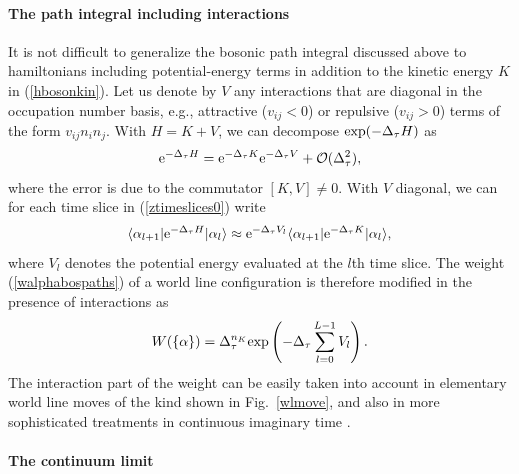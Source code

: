 \documentclass[draft,numberedheadings]{aipproc}
\begin{document}
\paragraph{The path integral including interactions}

It is not difficult to generalize the bosonic path integral discussed above to hamiltonians including potential-energy terms in addition to
the kinetic energy $K$ in (\ref{hbosonkin}). Let us denote by $V$ any interactions that are diagonal in the occupation number basis, e.g.,
attractive ($v_{ij}<0$) or repulsive ($v_{ij}>0$) terms of the form $v_{ij}n_in_j$. With $H=K+V$, we can decompose ${\rm exp}{(-\Delta_\tau H)}$ as
\begin{equation}
{\rm e}^{-\Delta_\tau H} = {\rm e}^{-\Delta_\tau K}{\rm e}^{-\Delta_\tau V} + {\cal O}(\Delta_\tau^2),
\label{kvtrotter}
\end{equation}
where the error is due to the commutator $[K,V]\not=0$. With $V$ diagonal, we can for each time slice in (\ref{ztimeslices0}) write
\begin{equation}
\langle \alpha_{l+1}|{\rm e}^{-\Delta_\tau H}|\alpha_l\rangle \approx {\rm e}^{-\Delta_\tau V_l}
\langle \alpha_{l+1}|{\rm e}^{-\Delta_\tau K}|\alpha_l\rangle,
\end{equation}
where $V_l$ denotes the potential energy evaluated at the $l$th time slice. The weight (\ref{walphabospaths}) of a world line configuration is 
therefore modified in the presence of interactions as
\begin{equation}
W(\{\alpha\})=\Delta_\tau^{n_K} {\rm exp}\left ( -\Delta_\tau \sum_{l=0}^{L-1}V_l \right ).
\label{walphabospaths2}
\end{equation}
The interaction part of the weight can be easily taken into account in elementary world line moves of the kind shown in Fig.~\ref{wlmove}, and also in
more sophisticated treatments in continuous imaginary time \cite{prokofev96}.

\paragraph{The continuum limit}
\end{document}
